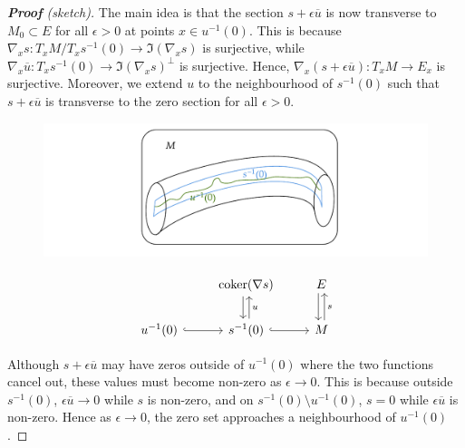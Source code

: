 \begin{proof}[\textbf{\textit{Proof}} (sketch)]
	The main idea is that the section $s+ \epsilon \overline{u}$ is now
	transverse to $M_0 \subset E$ for all $\epsilon > 0$ at points $x\in
	u^{-1}(0)$. This is because 
	$\nabla_x s : T_x M / T_x s^{-1}(0) \to \Im(\nabla_x s)$ is surjective, 
	while  $\nabla_x \overline{u} : T_x s^{-1}(0) \to \Im(\nabla_x s)^\perp$ 
	is surjective. Hence, $\nabla_x(s+\epsilon \overline{u}) : T_xM \to E_x$ is
	surjective. Moreover, we extend $u$ to the neighbourhood of  $s^{-1}(0)$ such
	that $s + \epsilon\overline{u}$ is transverse to the zero section for all
	$\epsilon > 0$. 
	\begin{figure}[htb]
		\begin{minipage}[c]{0.46\textwidth}
			\includegraphics[trim={43mm 5mm 41mm 2.8mm},clip,width=\textwidth]{figs/witten_coker.pdf}
		\end{minipage} 
		\begin{minipage}[c]{0.52\textwidth}
				\[\begin{tikzcd}
						& {\operatorname{coker}(\nabla s)} & E \\
							{u^{-1}(0)} & {s^{-1}(0)} & M
								\arrow[hook, from=2-1, to=2-2]
									\arrow[hook, from=2-2, to=2-3]
										\arrow[shift right=1, from=1-3, to=2-3]
											\arrow["u"', shift right=1,
											from=2-2, to=1-2]
												\arrow[shift right=1, from=1-2,
												to=2-2]
													\arrow["s"', shift right=1,
													from=2-3, to=1-3]
						\end{tikzcd}\]
			
		\end{minipage} 
	    \hfill
	\end{figure}
	Although $s+ \epsilon \overline{u}$ may have zeros outside of
	$u^{-1}(0)$ where the two functions cancel out, these values must
	become non-zero as $\epsilon\to 0$. This is because outside  $s^{-1}(0)$,
	$\epsilon\overline{u} \to 0$ while $s$ is non-zero, and on 
	$s^{-1}(0) \setminus u^{-1}(0)$,  $s=0$ while  $\epsilon \overline{u}$ is
	non-zero. Hence as $\epsilon \to 0$, the zero set approaches a
	neighbourhood of  $u^{-1}(0)$. 


\end{proof}
